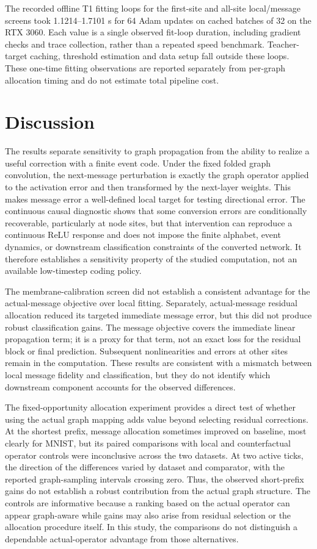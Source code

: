 \documentclass[11pt]{article}
\begin{document}
The recorded offline T1 fitting loops for the first-site and all-site local/message screens took 1.1214--1.7101 s for 64 Adam updates on cached batches of 32 on the RTX 3060. Each value is a single observed fit-loop duration, including gradient checks and trace collection, rather than a repeated speed benchmark. Teacher-target caching, threshold estimation and data setup fall outside these loops. These one-time fitting observations are reported separately from per-graph allocation timing and do not estimate total pipeline cost.

\section{Discussion}

The results separate sensitivity to graph propagation from the ability to realize a useful correction with a finite event code. Under the fixed folded graph convolution, the next-message perturbation is exactly the graph operator applied to the activation error and then transformed by the next-layer weights. This makes message error a well-defined local target for testing directional error. The continuous causal diagnostic shows that some conversion errors are conditionally recoverable, particularly at node sites, but that intervention can reproduce a continuous ReLU response and does not impose the finite alphabet, event dynamics, or downstream classification constraints of the converted network. It therefore establishes a sensitivity property of the studied computation, not an available low-timestep coding policy.

The membrane-calibration screen did not establish a consistent advantage for the actual-message objective over local fitting. Separately, actual-message residual allocation reduced its targeted immediate message error, but this did not produce robust classification gains. The message objective covers the immediate linear propagation term; it is a proxy for that term, not an exact loss for the residual block or final prediction. Subsequent nonlinearities and errors at other sites remain in the computation. These results are consistent with a mismatch between local message fidelity and classification, but they do not identify which downstream component accounts for the observed differences.

The fixed-opportunity allocation experiment provides a direct test of whether using the actual graph mapping adds value beyond selecting residual corrections. At the shortest prefix, message allocation sometimes improved on baseline, most clearly for MNIST, but its paired comparisons with local and counterfactual operator controls were inconclusive across the two datasets. At two active ticks, the direction of the differences varied by dataset and comparator, with the reported graph-sampling intervals crossing zero. Thus, the observed short-prefix gains do not establish a robust contribution from the actual graph structure. The controls are informative because a ranking based on the actual operator can appear graph-aware while gains may also arise from residual selection or the allocation procedure itself. In this study, the comparisons do not distinguish a dependable actual-operator advantage from those alternatives.
\end{document}
